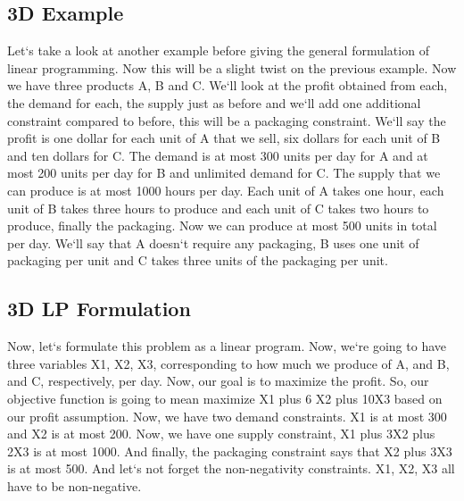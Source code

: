 \subsection{3D Example}
Let`s take a look at another example before giving the general formulation of linear programming.
Now this will be a slight twist on the previous example.
Now we have three products A, B and C\@.
We`ll look at the profit obtained from each, the demand for each, the supply just as before and we`ll add one additional constraint compared to before, this will be a packaging constraint.
We`ll say the profit is one dollar for each unit of A that we sell, six dollars for each unit of B and ten dollars for C\@.
The demand is at most 300 units per day for A and at most 200 units per day for B and unlimited demand for C\@.
The supply that we can produce is at most 1000 hours per day.
Each unit of A takes one hour, each unit of B takes three hours to produce and each unit of C takes two hours to produce, finally the packaging.
Now we can produce at most 500 units in total per day.
We`ll say that A doesn`t require any packaging, B uses one unit of packaging per unit and C takes three units of the packaging per unit.

\subsection{3D LP Formulation}
Now, let`s formulate this problem as a linear program.
Now, we`re going to have three variables X1, X2, X3, corresponding to how much we produce of A, and B, and C, respectively, per day.
Now, our goal is to maximize the profit.
So, our objective function is going to mean maximize X1 plus 6 X2 plus 10X3 based on our profit assumption.
Now, we have two demand constraints.
X1 is at most 300 and X2 is at most 200.
Now, we have one supply constraint, X1 plus 3X2 plus 2X3 is at most 1000.
And finally, the packaging constraint says that X2 plus 3X3 is at most 500.
And let`s not forget the non-negativity constraints.
X1, X2, X3 all have to be non-negative.

